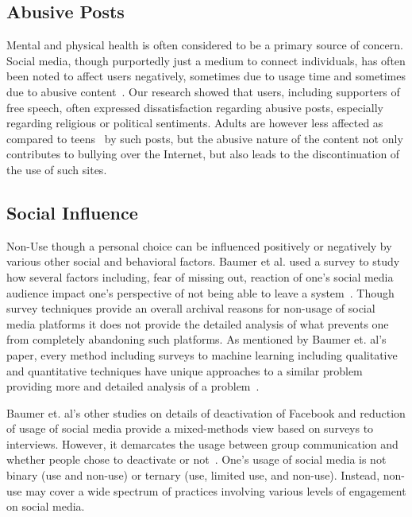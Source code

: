 \subsection{Abusive Posts}
Mental and physical health is often considered to be a primary source of concern. Social media, though purportedly just a medium to connect individuals, has often been noted to affect users negatively, sometimes due to usage time and sometimes due to abusive content~\cite{newyorktimes2017}. Our research showed that users, including supporters of free speech, often expressed dissatisfaction regarding abusive posts, especially regarding religious or political sentiments. Adults are however less affected as compared to teens~\cite{lenhart2011teens,rainie2012tone} by such posts, but the abusive nature of the content not only contributes to bullying over the Internet, but also leads to the discontinuation of the use of such sites.

\subsection{Social Influence}
Non-Use though a personal choice can be influenced positively or negatively by various other social and behavioral factors. Baumer et al. used a survey to study how several factors including, fear of missing out, reaction of one's social media audience impact one's perspective of not being able to leave a system~\cite{baumer2015missing}. Though survey techniques  provide an overall archival reasons for non-usage of social media platforms it does not provide the detailed analysis of what prevents one from completely abandoning such platforms. As mentioned by Baumer et. al's paper, every method including surveys to machine learning including qualitative and quantitative techniques have unique approaches to a similar problem providing more and detailed analysis of a problem~\cite{baumer2017comparing}.

Baumer et. al's other studies on details of deactivation of Facebook and reduction of usage of social media provide a mixed-methods view based on surveys to interviews. However, it demarcates the usage between group communication and whether people chose to deactivate or not~\cite{baumer2017subjects}. One's usage of social media is not binary (use and non-use) or ternary (use, limited use, and non-use). Instead, non-use may cover a wide spectrum of practices involving various levels of engagement on social media.

